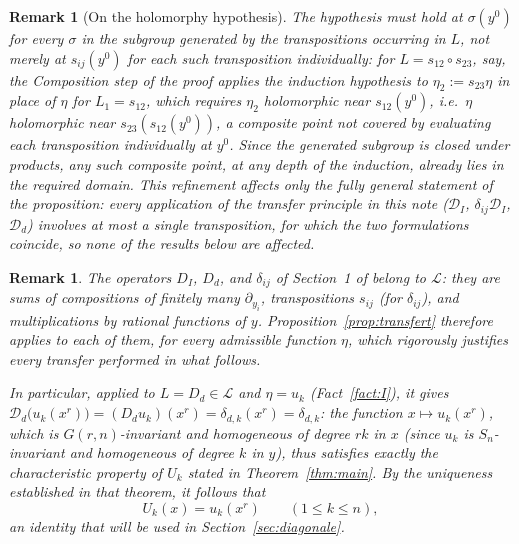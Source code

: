 \documentclass[10pt,a4paper]{amsart}
\newtheorem{remark}[theorem]{Remark}
\begin{document}
\begin{remark}[On the holomorphy hypothesis]\label{rem:holomorphy}
The hypothesis must hold at $\sigma(y^0)$ for \emph{every} $\sigma$ in the subgroup generated by the transpositions occurring in $L$, not merely at $s_{ij}(y^0)$ for each such transposition individually: for $L=s_{12}\circ s_{23}$, say, the Composition step of the proof applies the induction hypothesis to $\eta_2:=s_{23}\eta$ in place of $\eta$ for $L_1=s_{12}$, which requires $\eta_2$ holomorphic near $s_{12}(y^0)$, i.e.\ $\eta$ holomorphic near $s_{23}(s_{12}(y^0))$, a composite point not covered by evaluating each transposition individually at $y^0$. Since the generated subgroup is closed under products, any such composite point, at any depth of the induction, already lies in the required domain. This refinement affects only the fully general statement of the proposition: every application of the transfer principle in this note ($\mathcal D_I$, $\delta_{ij}\mathcal D_I$, $\mathcal D_d$) involves at most a single transposition, for which the two formulations coincide, so none of the results below are affected.
\end{remark}

\begin{remark}\label{rem:transfertusage}
The operators $D_I$, $D_d$, and $\delta_{ij}$ of Section~1 of \cite{Ze} belong to $\mathcal L$: they are sums of compositions of finitely many $\partial_{y_i}$, transpositions $s_{ij}$ (for $\delta_{ij}$), and multiplications by rational functions of $y$. Proposition~\ref{prop:transfert} therefore applies to each of them, for every admissible function $\eta$, which rigorously justifies every transfer performed in what follows.

In particular, applied to $L=D_d\in\mathcal L$ and $\eta=u_k$ (Fact~\ref{fact:I}), it gives $\mathcal D_d\big(u_k(x^r)\big) = (D_du_k)(x^r) = \delta_{d,k}(x^r)=\delta_{d,k}$: the function $x\mapsto u_k(x^r)$, which is $G(r,n)$-invariant and homogeneous of degree $rk$ in $x$ (since $u_k$ is $S_n$-invariant and homogeneous of degree $k$ in $y$), thus satisfies exactly the characteristic property of $U_k$ stated in Theorem~\ref{thm:main}. By the uniqueness established in that theorem, it follows that
\[
U_k(x) = u_k(x^r) \qquad (1\le k\le n),
\]
an identity that will be used in Section~\ref{sec:diagonale}.
\end{remark}
\end{document}
